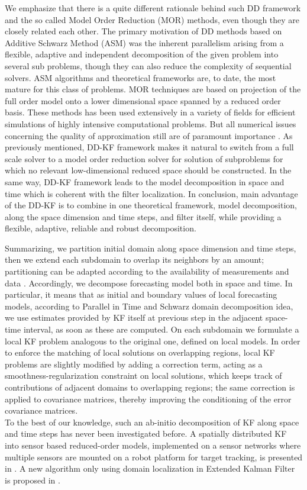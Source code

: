 \documentclass[smallcondensed]{svjour3}
\begin{document}
\noindent We emphasize that there is a quite different rationale behind such  DD framework and the so called Model Order Reduction  (MOR) methods, even though they are closely related each other.  
The primary motivation of DD methods based on  Additive Schwarz Method (ASM)  was the inherent parallelism arising from a flexible, adaptive  and independent decomposition of the given problem into several sub problems, though they can also reduce the complexity of sequential solvers. ASM  algorithms and theoretical frameworks  are, to date, the most mature for this class of problems. 
MOR techniques are based on projection of the full order model onto a lower dimensional space spanned by a reduced order basis. These methods has been used extensively in a variety of fields for efficient simulations of highly intensive computational problems. But all numerical issues  concerning the quality of approximation still are of paramount importance \cite{Petzold}.
As  previously mentioned, DD-KF  framework makes it natural to switch from a full scale solver to a model order reduction solver for solution of subproblems for which no relevant low-dimensional reduced space should be constructed. In the same way, DD-KF framework leads to the model decomposition in space and time which is coherent with the filter localization. In conclusion,  main advantage of the DD-KF  is to combine in one theoretical framework,  model decomposition, along the space dimension and time steps, and filter itself, while  providing a flexible,  adaptive, reliable and robust decomposition.  

\noindent Summarizing,  we partition initial domain  along space dimension and time steps,  then we extend each subdomain to overlap its neighbors by an amount; partitioning can be adapted according to  the availability of measurements and data \cite{DyDD}. Accordingly, we decompose forecasting model both in space and time. In particular, it means that as initial and boundary values of local forecasting  models, according to Parallel in Time and Schwarz domain decomposition idea, we  use  estimates provided by  KF  itself at previous step in the adjacent space-time interval, as soon as these are computed.  On each subdomain we formulate a local KF problem analogous to the original one, defined on local  models. In order to enforce the matching of local solutions on  overlapping regions, local KF problems are slightly modified by adding a correction term, acting as a smoothness-regularization constraint on local solutions, which keeps track of contributions of adjacent domains to  overlapping regions; the same correction is applied to covariance matrices,  thereby improving the conditioning of the error covariance matrices.  \\
    To the best of our knowledge, such  an ab-initio decomposition of KF along space and time steps has never been investigated before. A spatially distributed KF into sensor based reduced-order models, implemented on a sensor networks where multiple sensors are mounted on a robot platform for target tracking, is presented in \cite{Battistelli,Khan}. A new algorithm only using domain localization in Extended Kalman Filter is proposed in \cite{Janic}.   
\end{document}
